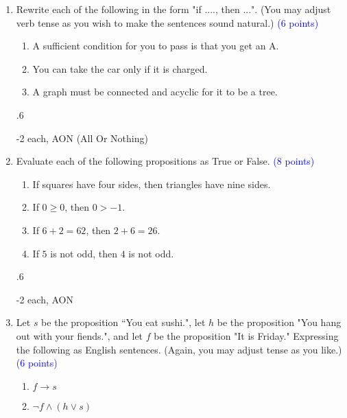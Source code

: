 \documentclass{article}
\newcommand{\pt}[1]{\textcolor{blue}{(#1 points)}}
\newenvironment{rubric} {
    \par
    \begin{spacing}{.6}
    \begin{itshape}
    \color{red}
} {
    \end{itshape}
    \end{spacing}
    \par
}
\begin{document}
\begin{enumerate}

    \item Rewrite each of the following in the form "if ...., then ...".  (You may adjust verb tense as you wish to make the sentences sound natural.) \pt 6
    
    \begin{enumerate}
        \item A sufficient condition for you to pass is that you get an A.
        
        \item You can take the car only if it is charged.
        
        \item A graph must be connected and acyclic for it to be a tree.
    \end{enumerate}
    
    \begin{rubric}
    -2 each, AON (All Or Nothing)
    \end{rubric}
    
    \item Evaluate each of the following propositions as True or False. \pt 8
    \begin{enumerate}
        \item If squares have four sides, then triangles have nine sides.
        \item If $0 \geq 0$, then $0 > -1$.
        \item If $6+2 = 62$, then $2+6=26$.
        \item If $5$ is not odd, then $4$ is not odd. 
    \end{enumerate}
    
    \begin{rubric}
    -2 each, AON
    \end{rubric}
    
    \item Let $s$ be the proposition ``You eat sushi.", let $h$ be the proposition "You hang out with your fiends.", and let $f$ be the proposition "It is Friday." Expressing the following as English sentences. (Again, you may adjust tense as you like.) \pt 6
    
    \begin{enumerate}
        \item $f \rightarrow s$
        \item $\lnot f \wedge (h \vee s)$
    \end{enumerate}
    

\end{enumerate}
\end{document}
